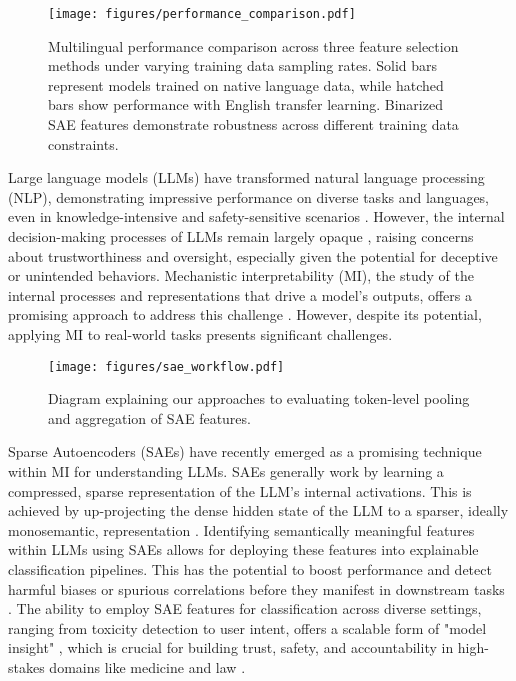 \begin{figure}[!htp]
    \centering
    \texttt{[image: figures/performance\_comparison.pdf]}
    \caption{Multilingual performance comparison across three feature selection methods under varying training data sampling rates. Solid bars represent models trained on native language data, while hatched bars show performance with English transfer learning. Binarized SAE features demonstrate robustness across different training data constraints.}
    \label{fig:sampling-main}
\end{figure}

Large language models (LLMs) have transformed natural language processing (NLP), demonstrating impressive performance on diverse tasks and languages, even in knowledge-intensive and safety-sensitive scenarios \cite{hendrycks2023overview, ngo2022alignment, cammarata2021curve}.  However, the internal decision-making processes of LLMs remain largely opaque \cite{cammarata2021curve}, raising concerns about trustworthiness and oversight, especially given the potential for deceptive or unintended behaviors. Mechanistic interpretability (MI), the study of the internal processes and representations that drive a model's outputs, offers a promising approach to address this challenge \cite{elhage2022toy, wang2022interpretability}. However, despite its potential, applying MI to real-world tasks presents significant challenges.


\begin{figure*}[ht]
    \centering
    \texttt{[image: figures/sae\_workflow.pdf]}
    \caption{Diagram explaining our approaches to evaluating token-level pooling and aggregation of SAE features.}
    \label{fig:workflow}
\end{figure*}
\raggedbottom


Sparse Autoencoders (SAEs) have recently emerged as a promising technique within MI for understanding LLMs. SAEs generally work by learning a compressed, sparse representation of the LLM's internal activations.  This is achieved by up-projecting the dense hidden state of the LLM to a sparser, ideally monosemantic, representation \cite{bricken2023towards, cunningham2023scaling}. Identifying semantically meaningful features within LLMs using SAEs allows for deploying these features into explainable classification pipelines. This has the potential to boost performance and detect harmful biases or spurious correlations before they manifest in downstream tasks \cite{anthropic2024features}.  The ability to employ SAE features for classification across diverse settings, ranging from toxicity detection to user intent, offers a scalable form of "model insight" \cite{bowman2022measuringprogressscalableoversight}, which is crucial for building trust, safety, and accountability in high-stakes domains like medicine and law \cite{abdulaal2024xrayworth15features}.

